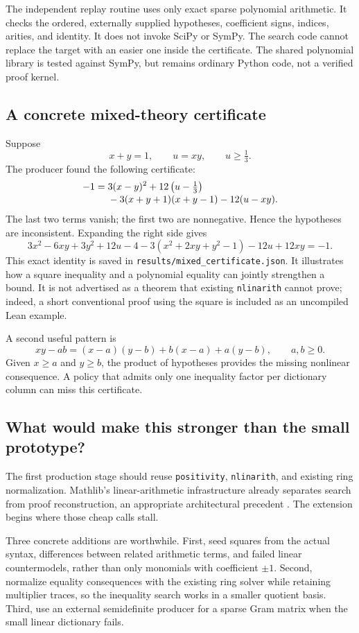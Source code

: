 \documentclass[11pt,a4paper]{article}
\newcommand{\code}[1]{\texttt{#1}}
\begin{document}
The independent replay routine uses only exact sparse polynomial arithmetic. It checks the ordered, externally supplied hypotheses, coefficient signs, indices, arities, and identity. It does not invoke SciPy or SymPy. The search code cannot replace the target with an easier one inside the certificate. The shared polynomial library is tested against SymPy, but remains ordinary Python code, not a verified proof kernel.

\subsection{A concrete mixed-theory certificate}
Suppose
\[
 x+y=1,\qquad u=xy,\qquad u\ge\tfrac13.
\]
The producer found the following certificate:
\begin{align}\label{eq:mixed}
 -1={}&3(x-y)^2+12\left(u-\tfrac13\right)\\[-2pt]
 &-3(x+y+1)(x+y-1)-12(u-xy).\notag
\end{align}
The last two terms vanish; the first two are nonnegative. Hence the hypotheses are inconsistent. Expanding the right side gives
\[
 3x^2-6xy+3y^2+12u-4
 -3(x^2+2xy+y^2-1)-12u+12xy=-1.
\]
This exact identity is saved in \code{results/mixed\_certificate.json}. It illustrates how a square inequality and a polynomial equality can jointly strengthen a bound. It is not advertised as a theorem that existing \code{nlinarith} cannot prove; indeed, a short conventional proof using the square is included as an uncompiled Lean example.

A second useful pattern is
\[
 xy-ab=(x-a)(y-b)+b(x-a)+a(y-b),
 \qquad a,b\ge0.
\]
Given $x\ge a$ and $y\ge b$, the product of hypotheses provides the missing nonlinear consequence. A policy that admits only one inequality factor per dictionary column can miss this certificate.

\subsection{What would make this stronger than the small prototype?}
The first production stage should reuse \code{positivity}, \code{nlinarith}, and existing ring normalization. Mathlib's linear-arithmetic infrastructure already separates search from proof reconstruction, an appropriate architectural precedent \cite{linarith,positivity}. The extension begins where those cheap calls stall.

Three concrete additions are worthwhile. First, seed squares from the actual syntax, differences between related arithmetic terms, and failed linear countermodels, rather than only monomials with coefficient $\pm1$. Second, normalize equality consequences with the existing ring solver while retaining multiplier traces, so the inequality search works in a smaller quotient basis. Third, use an external semidefinite producer for a sparse Gram matrix when the small linear dictionary fails.
\end{document}
